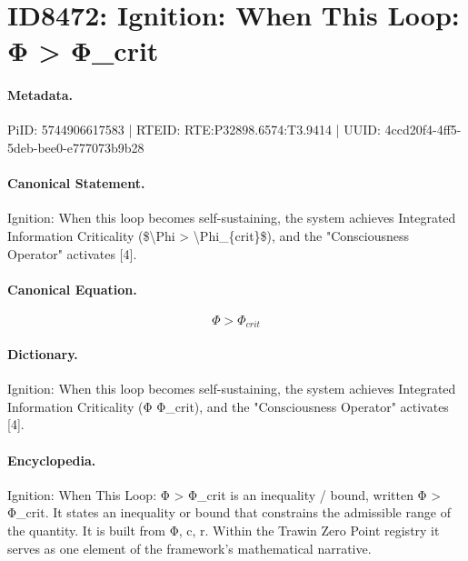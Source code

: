 \section*{ID8472: Ignition: When This Loop: Φ > Φ\_crit}
\paragraph{Metadata.}
PiID: 5744906617583 | RTEID: RTE:P32898.6574:T3.9414 | UUID: 4ccd20f4-4ff5-5deb-bee0-e777073b9b28

\paragraph{Canonical Statement.}
Ignition: When this loop becomes self-sustaining, the system achieves Integrated Information Criticality (\$\textbackslash{}Phi > \textbackslash{}Phi\_\{crit\}\$), and the "Consciousness Operator" activates [4].

\paragraph{Canonical Equation.}
\[
\Phi > \Phi_{crit}
\]

\paragraph{Dictionary.}
Ignition: When this loop becomes self-sustaining, the system achieves Integrated Information Criticality (Φ Φ\_crit), and the "Consciousness Operator" activates [4].

\paragraph{Encyclopedia.}
Ignition: When This Loop: Φ > Φ\_crit is an inequality / bound, written Φ > Φ\_crit. It states an inequality or bound that constrains the admissible range of the quantity. It is built from Φ, c, r. Within the Trawin Zero Point registry it serves as one element of the framework's mathematical narrative.
